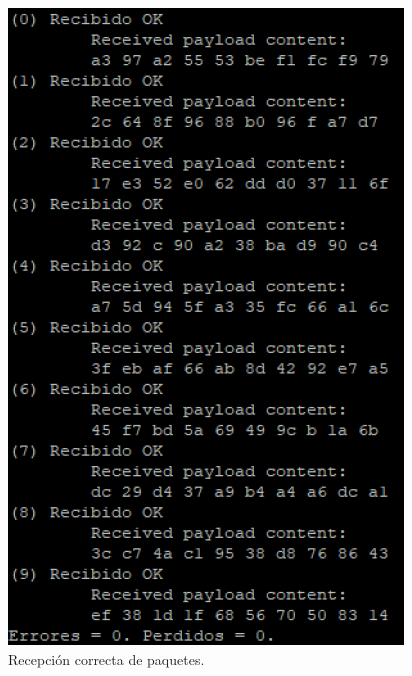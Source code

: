 \begin{figure}[ht]
	\centering
	  \begin{minipage}{7cm}
		\centering
		\includegraphics[scale=0.60]{./figuras/putty_rec.png}
		\caption{\small{Recepción correcta de paquetes.}}
		\label{ok}
	  \end{minipage}%
	  \hspace{5mm}
	  \begin{minipage}{7cm}
		\centering

\end{minipage}
\end{figure}
